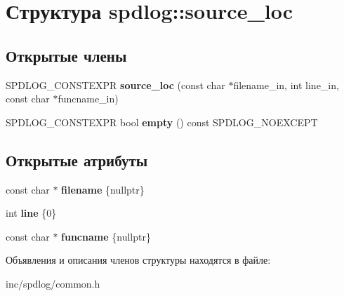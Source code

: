 \hypertarget{structspdlog_1_1source__loc}{}\section{Структура spdlog\+:\+:source\+\_\+loc}
\label{structspdlog_1_1source__loc}
\subsection*{Открытые члены}
\begin{DoxyCompactItemize}
\item 
\mbox{\label{structspdlog_1_1source__loc_ac010e62464fdc7ad527e84bf5cb4b7ec}} 
S\+P\+D\+L\+O\+G\+\_\+\+C\+O\+N\+S\+T\+E\+X\+PR {\bfseries source\+\_\+loc} (const char $\ast$filename\+\_\+in, int line\+\_\+in, const char $\ast$funcname\+\_\+in)
\item 
\mbox{\label{structspdlog_1_1source__loc_a87cedeee3cb80521f33c3cf86651ae96}} 
S\+P\+D\+L\+O\+G\+\_\+\+C\+O\+N\+S\+T\+E\+X\+PR bool {\bfseries empty} () const S\+P\+D\+L\+O\+G\+\_\+\+N\+O\+E\+X\+C\+E\+PT
\end{DoxyCompactItemize}
\subsection*{Открытые атрибуты}
\begin{DoxyCompactItemize}
\item 
\mbox{\label{structspdlog_1_1source__loc_af67920703a5ba0a5557eb86667e09c80}} 
const char $\ast$ {\bfseries filename} \{nullptr\}
\item 
\mbox{\label{structspdlog_1_1source__loc_a2f45855435225f5e000c054d9323cbe6}} 
int {\bfseries line} \{0\}
\item 
\mbox{\label{structspdlog_1_1source__loc_a622d48d070d0421ec91a6484923aacd2}} 
const char $\ast$ {\bfseries funcname} \{nullptr\}
\end{DoxyCompactItemize}


Объявления и описания членов структуры находятся в файле\+:\begin{DoxyCompactItemize}
\item 
inc/spdlog/common.\+h\end{DoxyCompactItemize}
